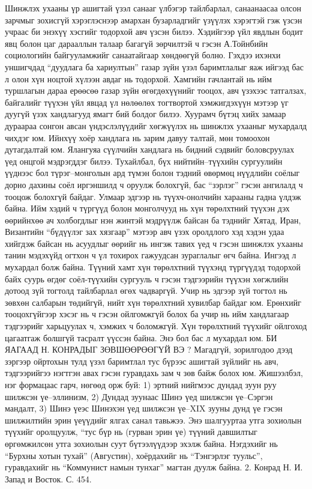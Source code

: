 Шинжлэх ухааны үр ашигтай үзэл санааг үлбэгэр тайлбарлал, санаанаасаа олсон зарчмыг зохисгүй хэрэглэснээр амархан бузарладгийг үзүүлэх хэрэгтэй гэж үзсэн учраас би энэхүү хэсгийг тодорхой авч үзсэн билээ. Хэдийгээр үйл явдлын бодит явц болон цаг дарааллын талаар багагүй зөрчилтэй ч гэсэн А.Тойнбийн социологийн байгууламжийг санаатайгаар хөндөөгүй болно. Гэхдээ ихэнхи уншигчдад “дуудлага ба хариултын” газар зүйн үзэл баримтлалыг яаж ийгээд бас л олон хүн ноцтой хүлээн авдаг нь тодорхой. Хамгийн гачлантай нь ийм туршлагын дараа ерөөсөө газар зүйн өгөгдөхүүнийг тооцох, авч үзэхээс татгалзах, байгалийг түүхэн үйл явцад үл нөлөөлөх тогтвортой хэмжигдэхүүн мэтээр үг дуугүй үзэх хандлагууд ямагт бий болдог билээ. Хуурамч бүтэц хийх замаар дураараа сонгон авсан үндэслэлүүдийг хөгжүүлэх нь шинжлэх ухааныг мухардалд чихдэг юм.
Ийнхүү хоёр хандлага нь зарим давуу талтай, мөн томоохон дутагдалтай юм. Ялангуяа сүүлчийн хандлага нь бидний сэдвийг боловсруулах үед онцгой мэдрэгддэг билээ. Тухайлбал, бүх нийтийн–түүхийн сургуулийн үүднээс бол түрэг–монголын ард түмэн болон тэдний өвөрмөц нүүдлийн соёлыг дорно дахины соёл иргэншилд ч оруулж болохгүй, бас “зэрлэг” гэсэн ангилалд ч тооцож болохгүй байдаг. Улмаар эдгээр нь түүхч-онолчийн харааны гадна үлдэж байна. Ийм хэдий ч түргүүд болон монголчууд нь хүн төрөлхтний түүхэн дэх өөрийнхөө ач холбогдлыг нэн жинтэй мэдрүүлж байсан ба тэднийг Хятад, Иран, Византийн “бүдүүлэг зах хязгаар” мэтээр авч үзэх оролдлого хэд хэдэн удаа хийгдэж байсан нь асуудлыг өөрийг нь ингэж тавих үед ч гэсэн шинжлэх ухааны танин мэдэхүйд огтхон ч үл тохирох гажуудсан зураглалыг өгч байна. Ингээд л мухардал болж байна.
Түүний хамт хүн төрөлхтний түүхэнд түргүүдэд тодорхой байх суурь өгдөг соёл-түүхийн сургууль ч гэсэн тэдгээрийн түүхэн хөгжлийн дотоод зүй тогтолд тайлбарлал өгөх чадваргүй. Учир нь эдгээр зүй тогтол нь зөвхөн салбарын төдийгүй, нийт хүн төрөлхтний хувилбар байдаг юм. Ерөнхийг тооцохгүйгээр хэсэг нь ч гэсэн ойлгомжгүй болох ба учир нь ийм хандлагаар тэдгээрийг харьцуулах ч, хэмжих ч боломжгүй. Хүн төрөлхтний түүхийг ойлгоход цагаатгаж болшгүй тасралт үүссэн байна. Энэ бол бас л мухардал юм.
БИ ЯАГААД Н. КОНРАДЫГ ЗӨВШӨӨРӨӨГҮЙ ВЭ ?
Магадгүй, зорилгодоо дээд зэргээр ойртохын тулд үзэл баримтлал тус бүрээс ашигтай зүйлийг нь авч, тэдгээрийгээ нэгтгэн авах гэсэн гуравдахь зам ч зөв байж болох юм. Жишээлбэл, нэг формацаас гарч, нөгөөд орж буй: 1) эртний нийгмээс дундад зуун руу шилжсэн үе–эллинизм, 2) Дундад зуунаас Шинэ үед шилжсэн үе–Сэргэн мандалт, 3) Шинэ үеэс Шинэхэн үед шилжсэн үе–XIX зууны дунд үе гэсэн шилжилтийн эрин үеүүдийг ялгах санал тавьжээ. Энэ шалгууртаа утга зохиолын түүхийг оролцуулж, “тус бүр нь (гурван эрин үе) түүний давшилтыг өргөмжилсөн утга зохиолын суут бүтээлүүдээр эхэлж байна. Нэгдэхийг нь “Бурхны хотын тухай” (Августин), хоёрдахийг нь “Тэнгэрлэг туульс”, гуравдахийг нь “Коммунист намын тунхаг” магтан дуулж байна. 2. Конрад Н. И. Запад и Восток. С. 454.
